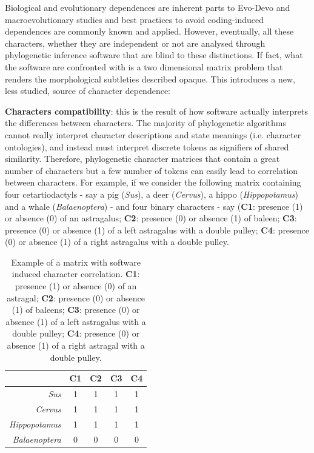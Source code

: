 \documentclass[12pt,letterpaper]{article}
\begin{document}
Biological and evolutionary dependences are inherent parts to Evo-Devo and macroevolutionary studies and best practices to avoid coding-induced dependences are commonly known and applied.
However, eventually, all these characters, whether they are independent or not are analysed through phylogenetic inference software that are blind to these distinctions.
If fact, what the software are confronted with is a two dimensional matrix problem that renders the morphological subtleties described opaque.
This introduces a new, less studied, source of character dependence:

\noindent \textbf{Characters compatibility}: this is the result of how software actually interprets the differences between characters.
The majority of phylogenetic algorithms cannot really interpret character descriptions and state meanings (i.e. character ontologies), and instead must interpret discrete tokens as signifiers of shared similarity.
Therefore, phylogenetic character matrices that contain a great number of characters but a few number of tokens can easily lead to correlation between characters.
For example, if we consider the following matrix containing four cetartiodactyls - say a pig (\textit{Sus}), a deer (\textit{Cervus}), a hippo (\textit{Hippopotamus}) and a whale (\textit{Balaenoptera}) - and four binary characters - say (\textbf{C1}: presence (1) or absence (0) of an astragalus; \textbf{C2}: presence (0) or absence (1) of baleen; \textbf{C3}: presence (0) or absence (1) of a left astragalus with a double pulley; \textbf{C4}: presence (0) or absence (1) of a right astragalus with a double pulley.

\begin{table}
\center
    \begin{tabular}{r|cccc}
            & C1 & C2 & C3 & C4\\
        \hline
        \textit{Sus} & 1 & 1 & 1 & 1\\
        \textit{Cervus} & 1 & 1 & 1 & 1\\
        \textit{Hippopotamus} & 1 & 1 & 1 & 1\\
        \textit{Balaenoptera} & 0 & 0 & 0 & 0\\
    \end{tabular}
    \caption{Example of a matrix with software induced character correlation. \textbf{C1}: presence (1) or absence (0) of an astragal; \textbf{C2}: presence (0) or absence (1) of baleens; \textbf{C3}: presence (0) or absence (1) of a left astragalus with a double pulley; \textbf{C4}: presence (0) or absence (1) of a right astragal with a double pulley.}
    \label{Tab:example_matrix}
\end{table}
\end{document}
